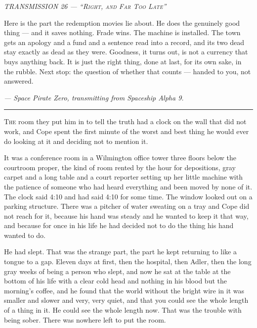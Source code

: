 \documentclass[11pt,openany]{book}
\newcommand{\transheader}{\normalfont\footnotesize\scshape\letterspace}
\newcommand{\letterspace}{}
\newenvironment{transmission}{%
  \par\vspace{0.3\baselineskip}\begin{center}\begin{minipage}{0.88\textwidth}%
  \itshape\small\setlength{\parindent}{0pt}\setstretch{1.06}}%
  {\end{minipage}\end{center}\vspace{0.4\baselineskip}%
  \noindent\hfil\rule{0.35\textwidth}{0.3pt}\hfil\par\vspace{1.0\baselineskip}}
\begin{document}
\begin{transmission}
{\transheader TRANSMISSION 26 --- ``Right, and Far Too Late''}\par\vspace{0.5em}
Here is the part the redemption movies lie about. He does the genuinely good thing --- and it saves nothing. Frade wins. The machine is installed. The town gets an apology and a fund and a sentence read into a record, and its two dead stay exactly as dead as they were. Goodness, it turns out, is not a currency that buys anything back. It is just the right thing, done at last, for its own sake, in the rubble. Next stop: the question of whether that counts --- handed to you, not answered.\par
\vspace{0.5em}\hfill\textit{--- Space Pirate Zero, transmitting from Spaceship Alpha 9.}\par
\end{transmission}


\lettrine[lines=3, lhang=0.05, nindent=0.25em]{T}{he} room they put him in to tell the truth had a clock on the wall that did not work, and Cope spent the first minute of the worst and best thing he would ever do looking at it and deciding not to mention it.

It was a conference room in a Wilmington office tower three floors below the courtroom proper, the kind of room rented by the hour for depositions, gray carpet and a long table and a court reporter setting up her little machine with the patience of someone who had heard everything and been moved by none of it. The clock said 4:10 and had said 4:10 for some time. The window looked out on a parking structure. There was a pitcher of water sweating on a tray and Cope did not reach for it, because his hand was steady and he wanted to keep it that way, and because for once in his life he had decided not to do the thing his hand wanted to do.

He had slept. That was the strange part, the part he kept returning to like a tongue to a gap. Eleven days at first, then the hospital, then Adler, then the long gray weeks of being a person who slept, and now he sat at the table at the bottom of his life with a clear cold head and nothing in his blood but the morning's coffee, and he found that the world without the bright wire in it was smaller and slower and very, very quiet, and that you could see the whole length of a thing in it. He could see the whole length now. That was the trouble with being sober. There was nowhere left to put the room.
\end{document}

